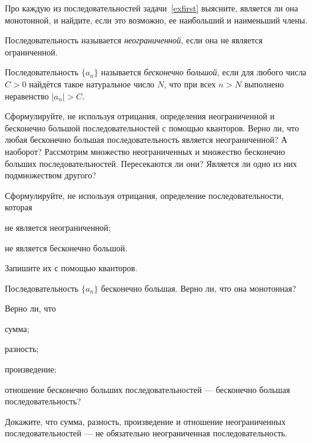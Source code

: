 \documentclass[a4paper, 12pt, num=2426, date=01.09.2020]{listok}
\begin{document}
\begin{problem}
    Про каждую из последовательностей задачи~\ref{exfirst} выясните,
    является ли она монотонной, и найдите, если это возможно, ее наибольший и наименьший члены.
\end{problem}

\pagebreak

\begin{definition}
    Последовательность называется \textit{неограниченной}, если она не является ограниченной.
\end{definition}

\begin{definition}
    Последовательность $\{a_n\}$ называется \textit{бесконечно большой}, если для любого числа $C > 0$ найдётся такое натуральное число $N$,
    что при всех $n > N$ выполнено неравенство $|a_n| > C$.
\end{definition}

\begin{problem}
    Сформулируйте, не используя отрицания, определения неограниченной и бесконечно большой последовательностей с помощью кванторов.
    Верно ли, что любая бесконечно большая последовательность является неограниченной? А наоборот?
    Рассмотрим множество неограниченных и множество бесконечно больших последовательностей. Пересекаются ли они?
    Является ли одно из них подмножеством другого?
\end{problem}

\begin{problem}
    Сформулируйте, не используя отрицания, определение последовательности, которая
    \begin{probparts}
        \item не является неограниченной;
        \item не является бесконечно большой.
    \end{probparts}
    Запишите их с помощью кванторов.
\end{problem}

\begin{problem}
    Последовательность $\{a_n\}$ бесконечно большая. Верно ли, что она монотонная?
\end{problem}

\begin{problem}
    Верно ли, что
    \begin{probparts}
        \item сумма;
        \item разность;
        \item произведение;
        \item отношение бесконечно больших последовательностей --- бесконечно большая последовательность?
        \item Докажите, что сумма, разность, произведение и отношение неограниченных последовательностей --- не обязательно неограниченная последовательность.
    \end{probparts}
\end{problem}
\end{document}
